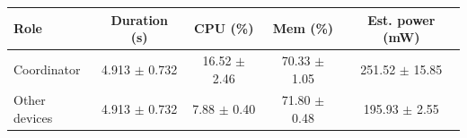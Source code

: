\begin{tabular}{lcccc}
\hline
\textbf{Role} & \textbf{Duration (s)} & \textbf{CPU (\%)} & \textbf{Mem (\%)} & \textbf{Est. power (mW)} \\
\hline
Coordinator & 4.913 $\pm$ 0.732 & 16.52 $\pm$ 2.46 & 70.33 $\pm$ 1.05 & 251.52 $\pm$ 15.85 \\
Other devices & 4.913 $\pm$ 0.732 & 7.88 $\pm$ 0.40 & 71.80 $\pm$ 0.48 & 195.93 $\pm$ 2.55 \\
\hline
\end{tabular}
